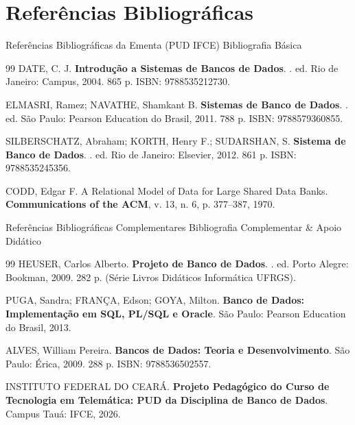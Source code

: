 \section{Referências Bibliográficas}

\begin{frame}{Referências Bibliográficas da Ementa (PUD IFCE)}
  \vspace{-0.2cm}
  \alert{Bibliografia Básica}\par
  \vspace{0.15cm}
  \begin{thebibliography}{99}
    \footnotesize
      DATE, C. J.
      \newblock \textbf{Introdução a Sistemas de Bancos de Dados}.
      . ed. Rio de Janeiro: Campus, 2004. 865 p. ISBN: 9788535212730.

      ELMASRI, Ramez; NAVATHE, Shamkant B.
      \newblock \textbf{Sistemas de Banco de Dados}.
      . ed. São Paulo: Pearson Education do Brasil, 2011. 788 p. ISBN: 9788579360855.

      SILBERSCHATZ, Abraham; KORTH, Henry F.; SUDARSHAN, S.
      \newblock \textbf{Sistema de Banco de Dados}.
      . ed. Rio de Janeiro: Elsevier, 2012. 861 p. ISBN: 9788535245356.

      CODD, Edgar F.
      \newblock A Relational Model of Data for Large Shared Data Banks.
      \newblock \textbf{Communications of the ACM}, v. 13, n. 6, p. 377--387, 1970.
  \end{thebibliography}
\end{frame}

\begin{frame}{Referências Bibliográficas Complementares}
  \vspace{-0.2cm}
  \alert{Bibliografia Complementar \& Apoio Didático}\par
  \vspace{0.15cm}
  \begin{thebibliography}{99}
    \footnotesize
      HEUSER, Carlos Alberto.
      \newblock \textbf{Projeto de Banco de Dados}.
      . ed. Porto Alegre: Bookman, 2009. 282 p. (Série Livros Didáticos Informática UFRGS).

      PUGA, Sandra; FRANÇA, Edson; GOYA, Milton.
      \newblock \textbf{Banco de Dados: Implementação em SQL, PL/SQL e Oracle}.
      \newblock São Paulo: Pearson Education do Brasil, 2013.

      ALVES, William Pereira.
      \newblock \textbf{Bancos de Dados: Teoria e Desenvolvimento}.
      \newblock São Paulo: Érica, 2009. 288 p. ISBN: 9788536502557.

      INSTITUTO FEDERAL DO CEARÁ.
      \newblock \textbf{Projeto Pedagógico do Curso de Tecnologia em Telemática: PUD da Disciplina de Banco de Dados}.
      \newblock Campus Tauá: IFCE, 2026.
  \end{thebibliography}
\end{frame}
